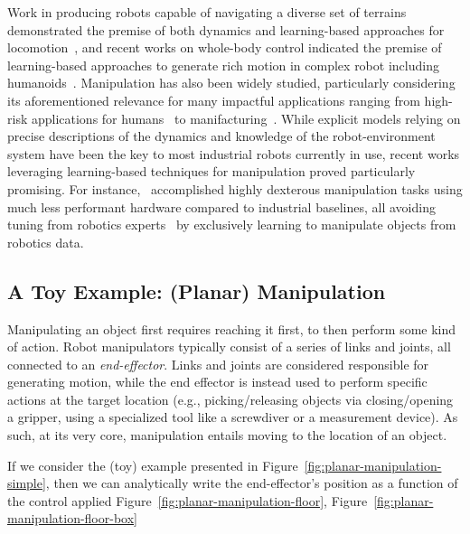 Work in producing robots capable of navigating a diverse set of terrains demonstrated the premise of both dynamics and learning-based approaches for locomotion~\citep{griffinWalkingStabilizationUsing2017,jiDribbleBotDynamicLegged2023,leeLearningQuadrupedalLocomotion2020,margolisRapidLocomotionReinforcement2022}, and recent works on whole-body control indicated the premise of learning-based approaches to generate rich motion in complex robot including humanoids~\citep{zhangWoCoCoLearningWholeBody2024,nvidiaGR00TN1Open2025}.
Manipulation has also been widely studied, particularly considering its aforementioned relevance for many impactful applications ranging from high-risk applications for humans~\citep{fujitaDevelopmentRobotsNuclear2020,alizadehComprehensiveSurveySpace2024,fujitaDevelopmentRobotsNuclear2020} to manifacturing~\citep{sannemanStateIndustrialRobotics2020}.
While explicit models relying on precise descriptions of the dynamics and knowledge of the robot-environment system have been the key to most industrial robots currently in use, recent works leveraging learning-based techniques for manipulation proved particularly promising. For instance,~\citet{zhaoLearningFineGrainedBimanual2023} accomplished highly dexterous manipulation tasks using much less performant hardware compared to industrial baselines, all avoiding tuning from robotics experts~\citep{zhaoLearningFineGrainedBimanual2023} by exclusively learning to manipulate objects from robotics data.

\subsection{A Toy Example: (Planar) Manipulation}
Manipulating an object first requires reaching it first, to then perform some kind of action.
Robot manipulators typically consist of a series of links and joints, all connected to an \emph{end-effector}.
Links and joints are considered responsible for generating motion, while the end effector is instead used to perform specific actions at the target location (e.g., picking/releasing objects via closing/opening a gripper, using a specialized tool like a screwdiver or a measurement device).
As such, at its very core, manipulation entails moving to the location of an object. 

If we consider the (toy) example presented in Figure~\ref{fig:planar-manipulation-simple}, then we can analytically write the end-effector's position as a function of the control applied
Figure~\ref{fig:planar-manipulation-floor}, 
Figure~\ref{fig:planar-manipulation-floor-box}

